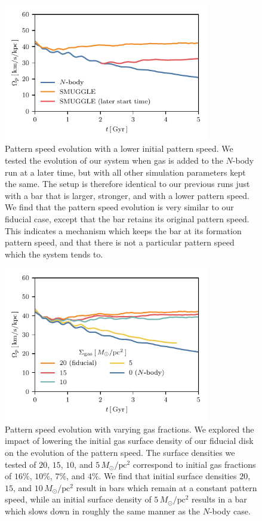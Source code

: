 \documentclass[twocolumn,linenumbers]{aastex631}
\newcommand{\Nbody}{$N$-body}
\newcommand{\Msun}{\ensuremath{M_{\odot}}}
\begin{document}
\begin{figure}
    \centering
    \includegraphics[width=9cm]{fig/ps_late_start.pdf}
    \caption{Pattern speed evolution with a lower initial pattern speed. We
    tested the evolution of our system when gas is added to the \Nbody{} run at
    a later time, but with all other simulation parameters kept the same. The
    setup is therefore identical to our previous runs just with a bar that is
    larger, stronger, and with a lower pattern speed. We find that the pattern
    speed evolution is very similar to our fiducial case, except that the bar
    retains its original pattern speed. This indicates a mechanism which keeps
    the bar at its formation pattern speed, and that there is not a particular
    pattern speed which the system tends to.}
    \label{fig:snap700}
\end{figure}

\begin{figure}
    \centering
    \includegraphics[width=9cm]{fig/ps_fgas.pdf}
    \caption{Pattern speed evolution with varying gas fractions. We explored the
    impact of lowering the initial gas surface density of our fiducial disk on
    the evolution of the pattern speed. The surface densities we tested of $20$,
    $15$, $10$, and $5\,\Msun/\textrm{pc}^2$ correspond to initial gas
    fractions of $16\%$, $10\%$, $7\%$, and $4\%$. We find that initial surface
    densities $20$, $15$, and $10\,\Msun/\textrm{pc}^2$ result in bars which
    remain at a constant pattern speed, while an initial surface density of
    $5\,\Msun/\textrm{pc}^2$ results in a bar which slows down in roughly the
    same manner as the \Nbody{} case.}
    \label{fig:fgas}
\end{figure}
\end{document}
